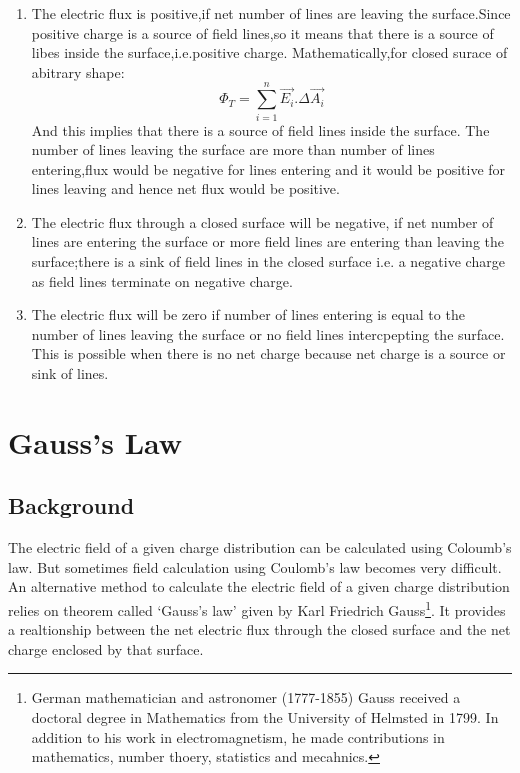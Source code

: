 \begin{enumerate}[label=(\roman*)]
\item The electric flux is positive,if net number of lines are leaving the surface.Since positive charge is a source of field lines,so it means that there is a source of libes inside the surface,i.e.positive charge.
Mathematically,for closed surace of abitrary shape:
\begin{equation} 
  \Phi_{T} = \sum_{i=1}^{n} \vec{E_{i}}.\Delta \vec{A_{i}} \nonumber
\end{equation}
And this implies that there is a source of field lines inside the surface.
The number of lines leaving the surface are more than number of lines entering,flux would be negative for lines entering and it would be positive for lines leaving and hence net flux would be positive.
\item The electric flux through a closed surface will be negative,
if net number of lines are entering the surface or more field lines are entering than leaving the surface;there is a sink of field lines in the closed surface i.e. a negative charge as field lines terminate on negative charge.
\item The electric flux will be zero if number of lines entering is 
equal to the number of lines leaving the surface or no field lines
intercpepting the surface. This is possible when there is no net charge
because net charge is a source or sink of lines.
\end{enumerate}
\section{Gauss’s Law}
\subsection*{Background}
The electric field of a given charge distribution can be calculated
using Coloumb’s law. But sometimes field calculation using Coulomb’s law
becomes very difficult. An alternative method to calculate the electric
field of a given charge distribution relies on theorem called ‘Gauss’s law’
given by Karl Friedrich Gauss\footnote{German mathematician and astronomer (1777-1855) Gauss received a doctoral degree
in Mathematics from the University of Helmsted in 1799. In addition to his
work in electromagnetism, he made contributions in mathematics,
number thoery, statistics and mecahnics.}.
It provides a realtionship between the net electric flux
through the closed surface and the net charge enclosed by that surface.
